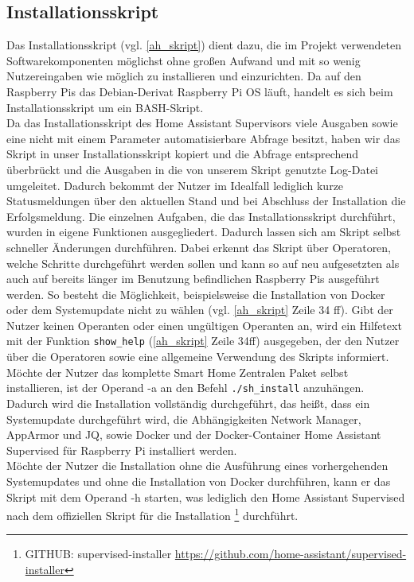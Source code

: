\subsection{Installationsskript}\label{sw_install}
Das Installationsskript (vgl. \ref{ah_skript}) dient dazu, die im Projekt verwendeten Softwarekomponenten möglichst ohne großen Aufwand und mit so wenig Nutzereingaben wie möglich zu installieren und einzurichten. 
Da auf den Raspberry Pis das Debian-Derivat Raspberry Pi OS läuft, handelt es sich beim Installationsskript um ein BASH-Skript.\\
\noindent Da das Installationsskript des Home Assistant Supervisors viele Ausgaben sowie eine nicht mit einem Parameter automatisierbare Abfrage besitzt, haben wir das Skript in unser Installationsskript kopiert und die Abfrage entsprechend überbrückt und die Ausgaben in die von unserem Skript genutzte Log-Datei umgeleitet.
Dadurch bekommt der Nutzer im Idealfall lediglich kurze Statusmeldungen über den aktuellen Stand und bei Abschluss der Installation die Erfolgsmeldung.
Die einzelnen Aufgaben, die das Installationsskript durchführt, wurden in eigene Funktionen ausgegliedert. Dadurch lassen sich am Skript selbst schneller Änderungen durchführen. 
Dabei erkennt das Skript über Operatoren, welche Schritte durchgeführt werden sollen und kann so auf neu aufgesetzten als auch auf bereits länger im Benutzung befindlichen Raspberry Pis ausgeführt werden.
So besteht die Möglichkeit, beispielsweise die Installation von Docker oder dem Systemupdate nicht zu wählen (vgl. \ref{ah_skript} Zeile 34 ff).
Gibt der Nutzer keinen Operanten oder einen ungültigen Operanten an, wird ein Hilfetext mit der Funktion \texttt{show\_help} (\ref{ah_skript} Zeile 34ff) ausgegeben, der den Nutzer über die Operatoren sowie eine allgemeine Verwendung des Skripts informiert.\\
\noindent Möchte der Nutzer das komplette Smart Home Zentralen Paket selbst installieren, ist der Operand -a an den Befehl \texttt{./sh\_install} anzuhängen. Dadurch wird die Installation vollständig durchgeführt, das heißt, dass ein Systemupdate durchgeführt wird, die Abhängigkeiten Network Manager, AppArmor und JQ, sowie Docker und der Docker-Container Home Assistant Supervised für Raspberry Pi installiert werden.\\
\noindent Möchte der Nutzer die Installation ohne die Ausführung eines vorhergehenden Systemupdates und ohne die Installation von Docker durchführen, kann er das Skript mit dem Operand -h starten, was lediglich den Home Assistant Supervised nach dem offiziellen Skript für die Installation \footnote{GITHUB: supervised-installer \url{https://github.com/home-assistant/supervised-installer}} durchführt.\\ 
